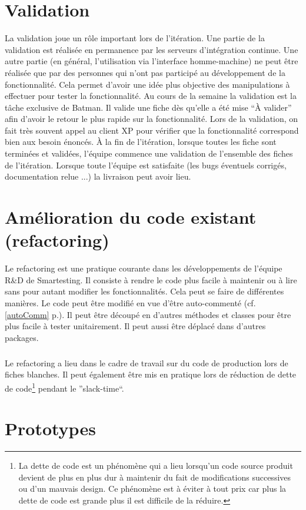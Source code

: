 \section{Validation}
La validation joue un rôle important lors de l'itération. Une partie de la validation est réalisée en permanence par les serveurs d'intégration continue. Une autre partie (en général, l'utilisation via l'interface homme-machine) ne peut être réalisée que par des personnes qui n'ont pas participé au développement de la fonctionnalité. Cela permet d'avoir une idée plus objective des manipulations à effectuer pour tester la fonctionnalité. Au cours de la semaine la validation est la tâche exclusive de Batman. Il valide une fiche dès qu'elle a été mise ``À valider'' afin d'avoir le retour le plus rapide sur la fonctionnalité. Lors de la validation, on fait très souvent appel au client XP pour vérifier que la fonctionnalité correspond bien aux besoin énoncés. À la fin de l'itération, lorsque toutes les fiche sont terminées et validées, l'équipe commence une validation de l'ensemble des fiches de l'itération. Lorsque toute l'équipe est satisfaite (les bugs éventuels corrigés, documentation relue ...) la livraison peut avoir lieu.
\section{Amélioration du code existant (refactoring)}
Le refactoring est une pratique courante dans les développements de l'équipe R\&D de Smartesting. Il consiste à rendre le code plus facile à maintenir ou à lire sans pour autant modifier les fonctionnalités. Cela peut se faire de différentes manières. Le code peut être modifié en vue d'être auto-commenté (cf. \ref{autoComm} p.\pageref{autoComm}). Il peut être découpé en d'autres méthodes et classes pour être plus facile à tester unitairement. Il peut aussi être déplacé dans d'autres packages.
\subparagraph*{}
Le refactoring a lieu dans le cadre de travail sur du code de production lors de fiches blanches. Il peut également être mis en pratique lors de réduction de dette de code\footnote{La dette de code est un phénomène qui a lieu lorsqu'un code source produit devient de plus en plus dur à maintenir du fait de modifications successives ou d'un mauvais design. Ce phénomène est à éviter à tout prix car plus la dette de code est grande plus il est difficile de la réduire.} pendant le ''slack-time``.
\section{Prototypes}
